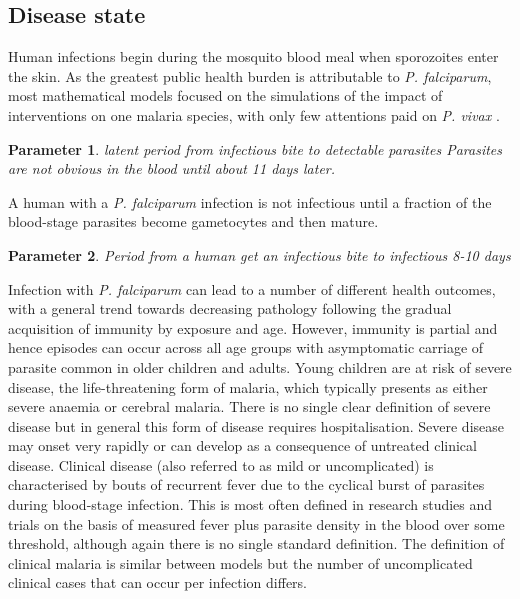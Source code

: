 \documentclass[a4paper, 12pt, twoside]{article}
\newtheorem{parameter}{Parameter}
\begin{document}
\subsection{Disease state}
Human infections begin during the mosquito blood meal when sporozoites enter the skin.
As the greatest public health burden is attributable to \textit{P. falciparum}, most mathematical models focused on the simulations of the impact of interventions on one malaria species, with only few attentions paid on \textit{P. vivax} \cite{White2018b} .

\begin{parameter}
	{latent period from infectious bite to detectable parasites}
	Parasites are not obvious in the blood until about 11 days later.
\end{parameter}

A human with a \textit{P. falciparum} infection is not infectious until a fraction of the blood-stage parasites become gametocytes and then mature.

\begin{parameter}
	{Period from a human get an infectious bite to infectious}
	{8-10 days}
\end{parameter}

Infection with \textit{P. falciparum} can lead to a number of different health outcomes, with a general trend towards decreasing pathology following the gradual acquisition of immunity by exposure and age.
However, immunity is partial and hence episodes can occur across all age groups with asymptomatic carriage of parasite common in older children and adults.
Young children are at risk of severe disease, the life-threatening form of malaria, which typically presents as either severe anaemia or cerebral malaria.
There is no single clear definition of severe disease but in general this form of disease requires hospitalisation.
Severe disease may onset very rapidly or can develop as a consequence of untreated clinical disease.
Clinical disease (also referred to as mild or uncomplicated) is characterised by bouts of recurrent fever due to the cyclical burst of parasites during blood-stage infection.
This is most often defined in research studies and trials on the basis of measured fever plus parasite density in the blood over some threshold, although again there is no single standard definition.
The definition of clinical malaria is similar between models but the number of uncomplicated clinical cases that can occur per infection differs.
\end{document}
